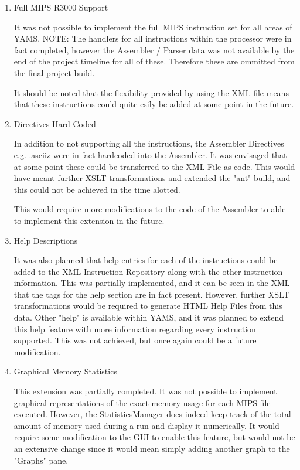 \begin{enumerate}

\item Full MIPS R3000 Support

It was not possible to implement the full MIPS instruction set for all areas of YAMS. NOTE: The handlers for all instructions  within the processor were in fact completed, however the Assembler / Parser data was not available by the end of the project timeline for all of these. Therefore these are ommitted from the final project build.

It should be noted that the flexibility provided by using the XML file means that these instructions could quite esily be added at some point in the future.

\item Directives Hard-Coded

In addition to not supporting all the instructions, the Assembler Directives e.g. .asciiz were in fact hardcoded into the Assembler. It was envisaged that at some point these could be transferred to the XML File as code. This would have meant further XSLT transformations and extended the "ant" build, and this could not be achieved in the time alotted.

This would require more modifications to the code of the Assembler to able to implement this extension in the future.

\item Help Descriptions

It was also planned that help entries for each of the instructions could be added to the XML Instruction Repository along with the other instruction information. This was partially implemented, and it can be seen in the XML that the tags for the help section are in fact present. However, further XSLT transformations would be required to generate HTML Help Files from this data. Other "help" is available within YAMS, and it was planned to extend this help feature with more information regarding every instruction supported. This was not achieved, but once again could be a future modification. 

\item Graphical Memory Statistics

This extension was partially completed. It was not possible to implement graphical representations of the exact memory usage for each MIPS file executed. However, the StatisticsManager does indeed keep track of the total amount of memory used during a run and display it numerically. It would require some modification to the GUI to enable this feature, but would not be an extensive change since it would mean simply adding another graph to the "Graphs" pane.

\end{enumerate}



